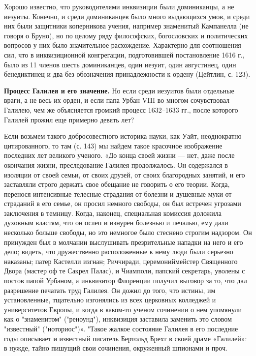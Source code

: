Хорошо известно, что руководителями  инквизиции были доминиканцы, а не
иезуиты. Конечно, и  среди доминиканцев было много  выдающихся умов, и
среди  них  были  защитники коперникова  учения,  например  знаменитый
Кампанелла  (не  говоря  о  Бруно), но  по  целому  ряду  философских,
богословских  и   политических  вопросов   у  них   было  значительное
расхождение.  Характерно для  соотношения  сил,  что в  инквизиционной
конгрегации, подготовившей  постановление 1616  г., было из  11 членов
шесть доминиканцев, один иезуит,  один августинец, один бенедиктинец и
два без обозначения принадлежности к ордену (Цейтлин, с. 123).

\textbf{Процесс Галилея и  его значение.} Но если  среди иезуитов были
отдельные враги, а не весь их орден,  и если папа Урбан VIII во многом
сочувствовал Галилею,  чем же  объясняется громкий  процесс 1632--1633
гг., после которого Галилей прожил еще примерно девять лет?

Если  возьмем   такого  добросовестного  историка  науки,   как  Уайт,
неоднократно цитированного, то там (с.  143) мы найдем такое красочное
изображение последних лет великого ученого.  «До конца своей жизни ---
нет, даже  после окончания жизни, преследование  Галилея продолжалось.
Он содержался  в изоляции от  своей семьи,  от своих друзей,  от своих
благородных занятий, и его заставляли  строго держать свое обещание не
говорить о его теории.  Когда, перенося интенсивные телесные страдания
от болезни и душевные муки от страданий в его семье, он просил немного
свободы,  он  был  встречен  угрозами  заключения  в  темницу.  Когда,
наконец, специальная комиссия доложила  духовным властям, что он ослеп
и изнурен  болезнью и печалью,  ему дали несколько больше  свободы, но
это  немногое  было стеснено  строгим  надзором.  Он принужден  был  в
молчании выслушивать презрительные нападки на него и его дело; видеть,
что  дружественно расположенные  к нему  люди были  серьезно наказаны;
патер  Кастелли изгнан;  Риччиради, церемониймейстер  Священного Двора
(мастер оф те Сакрел Палас),  и Чиамполи, папский секретарь, уволены с
постов папой  Урбаном, а инквизитор  Флоренции получил выговор  за то,
что  дал разрешение  печатать  труд  Галилея. Он  дожил  до того,  что
истины,  им  установленные,  тщательно изгонялись  из  всех  церковных
колледжей и университетов Европы, и  когда в каком-то ученом сочинении
о нем  упомянули как о "знаменитом"  ("реноунд"), инквизиция заставила
заменить это словом "известный" ("ноториос")». "Такое жалкое состояние
Галилея в его  последние годы описывает и  известный писатель Бертольд
Брехт в своей драме «Галилей»:  в нужде, тайно пишущий свои сочинения,
окруженный шпионами и проч.


